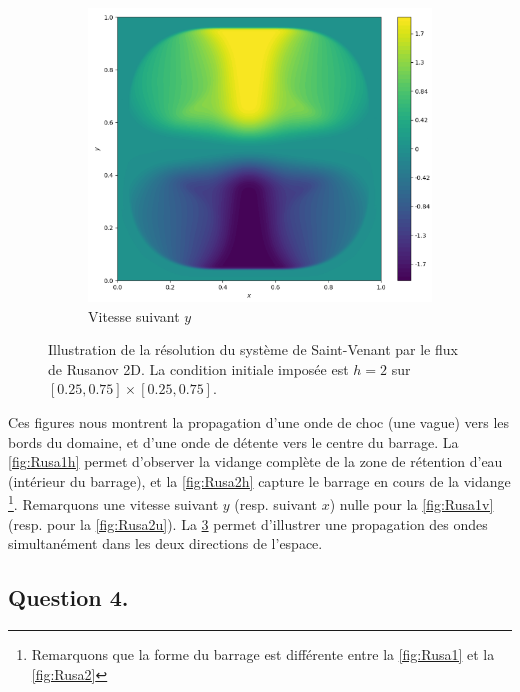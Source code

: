 \documentclass[
	french,
	11pt, %
]{fphw}
\begin{document}
\begin{figure}[H]
\begin{subfigure}{0.32\textwidth}
		\label{fig:Rusa3u}
	\end{subfigure}
	\begin{subfigure}{0.32\textwidth}
		\centering
		\includegraphics[width=\textwidth,height=0.85\textwidth]{Rusa3v.png}
		\caption{Vitesse suivant $y$}
		\label{fig:Rusa3v}
	\end{subfigure}
	\caption{Illustration de la résolution du système de Saint-Venant par le flux de Rusanov 2D. La condition initiale imposée est $ h = 2$ sur $[0.25,0.75]\times[0.25,0.75]$.}
	\label{fig:Rusa3}
\end{figure}

\noindent Ces figures nous montrent la propagation d'une onde de choc (une vague) vers les bords du domaine, et d'une onde de détente vers le centre du barrage. La \cref{fig:Rusa1h} permet d'observer la vidange complète de la zone de rétention d'eau (intérieur du barrage), et la \cref{fig:Rusa2h} capture le barrage en cours de la vidange \footnote{Remarquons que la forme du barrage est différente entre la \cref{fig:Rusa1} et la \cref{fig:Rusa2}}. Remarquons une vitesse suivant $y$ (resp. suivant $x$) nulle pour la \cref{fig:Rusa1v} (resp. pour la \cref{fig:Rusa2u}). La \cref{fig:Rusa3} permet d'illustrer une propagation des ondes simultanément dans les deux directions de l'espace. 

\subsection*{Question 4.}
\end{document}
